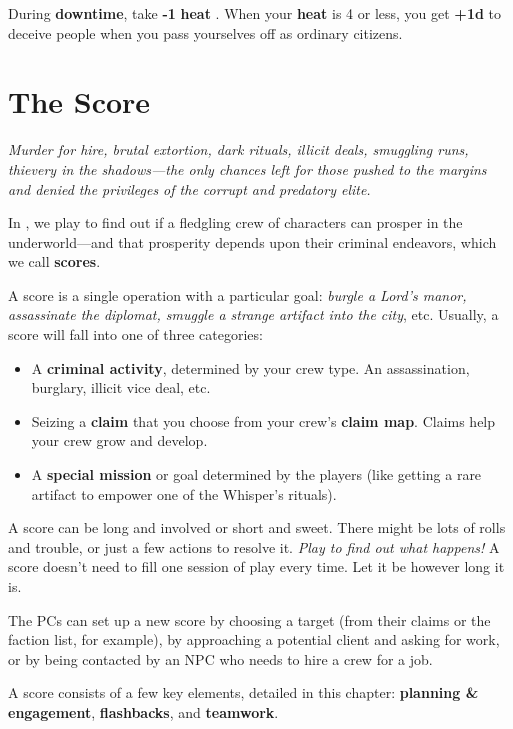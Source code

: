 \documentclass[11pt,fleqn,a5paper]{book}
\newcommand{\gameterm}[1]{\textbf{#1}}
\begin{document}
During \textbf{downtime}, take \textbf{-1 }\gameterm{heat} . When your \gameterm{heat}  is 4 or less, you get \textbf{+1d} to deceive people when you pass yourselves off as ordinary citizens.

\part{The Score}

\emph{Murder for hire, brutal extortion, dark rituals, illicit deals, smuggling runs, thievery in the shadows---the only chances left for those pushed to the margins and denied the privileges of the corrupt and predatory elite.}

In \thetitle{}, we play to find out if a fledgling crew of characters can prosper in the underworld---and that prosperity depends upon their criminal endeavors, which we call \textbf{scores}.

A score is a single operation with a particular goal: \emph{burgle a Lord’s manor, assassinate the diplomat, smuggle a strange artifact into the city}, etc. Usually, a score will fall into one of three categories:

\begin{itemize}
	\item A \textbf{criminal activity}, determined by your crew type. An assassination, burglary, illicit vice deal, etc.
	\item Seizing a \textbf{claim} that you choose from your crew’s \textbf{claim map}. Claims help your crew grow and develop.
	\item A \textbf{special mission} or goal determined by the players (like getting a rare artifact to empower one of the Whisper’s rituals).
\end{itemize}

A score can be long and involved or short and sweet. There might be lots of rolls and trouble, or just a few actions to resolve it. \emph{Play to find out what happens!} A score doesn’t need to fill one session of play every time. Let it be however long it is.

The PCs can set up a new score by choosing a target (from their claims or the faction list, for example), by approaching a potential client and asking for work, or by being contacted by an NPC who needs to hire a crew for a job.

A score consists of a few key elements, detailed in this chapter: \textbf{planning \& engagement}, \textbf{flashbacks}, and \textbf{teamwork}.
\end{document}
